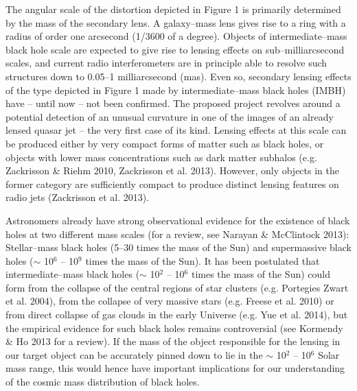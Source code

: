 \documentclass[a4paper, 11pt]{article}
\begin{document}
The angular scale of the distortion depicted in Figure 1 is primarily determined by the mass of the secondary lens. A galaxy--mass lens gives rise to a ring with a radius of order one arcsecond (1/3600 of a degree). Objects of intermediate--mass black hole scale are expected to give rise to lensing effects on sub--milliarcsecond scales, and current radio interferometers are in principle able to resolve such structures down to 0.05--1 milliarcsecond (mas). Even so, secondary lensing effects of the type depicted in Figure 1 made by intermediate--mass black holes (IMBH) have -- until now -- not been confirmed. The proposed project revolves around a potential detection of an unusual curvature in one of the images of an already lensed quasar jet -- the very first case of its kind. Lensing effects at this scale can be produced either by very compact forms of matter such as black holes, or objects with lower mass concentrations such as dark matter subhalos (e.g. Zackrisson \& Riehm 2010, Zackrisson et al. 2013). However, only objects in the former category are sufficiently compact to produce distinct lensing features on radio jets (Zackrisson et al. 2013). 

Astronomers already have strong observational evidence for the existence of black holes at two different mass scales (for a review, see Narayan \& McClintock 2013): Stellar--mass black holes (5--30 times the mass of the Sun) and supermassive black holes ($\sim$ 10$^6$ -- 10$^9$ times the mass of the Sun). It has been postulated that intermediate--mass black holes ($\sim$ 10$^2$ -- 10$^6$ times the mass of the Sun) could form from the collapse of the central regions of star clusters (e.g. Portegies Zwart et al. 2004), from the collapse of very massive stars (e.g. Freese et al. 2010) or from direct collapse of gas clouds in the early Universe (e.g. Yue et al. 2014), but the empirical evidence for such black holes remains controversial (see Kormendy \& Ho 2013 for a review). If the mass of the object responsible for the lensing in our target object can be accurately pinned down to lie in the $\sim$ 10$^2$ -- 10$^6$ Solar mass range, this would hence have important implications for our understanding of the cosmic mass distribution of black holes.
\end{document}
